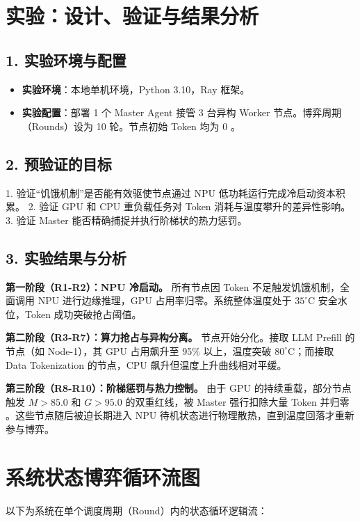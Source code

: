\documentclass[11pt,a4paper]{ctexart}
\begin{document}
\section{实验：设计、验证与结果分析}

\subsection{1. 实验环境与配置}
\begin{itemize}
    \item \textbf{实验环境}：本地单机环境，Python 3.10，Ray 框架。
    \item \textbf{实验配置}：部署 1 个 Master Agent 接管 3 台异构 Worker 节点。博弈周期（Rounds）设为 10 轮。节点初始 Token 均为 0 。
\end{itemize}

\subsection{2. 预验证的目标}
1. 验证“饥饿机制”是否能有效驱使节点通过 NPU 低功耗运行完成冷启动资本积累。
2. 验证 GPU 和 CPU 重负载任务对 Token 消耗与温度攀升的差异性影响。
3. 验证 Master 能否精确捕捉并执行阶梯状的热力惩罚。

\subsection{3. 实验结果与分析}
\textbf{第一阶段（R1-R2）：NPU 冷启动。} 所有节点因 Token 不足触发饥饿机制，全面调用 NPU 进行边缘推理，GPU 占用率归零。系统整体温度处于 $35^\circ\text{C}$ 安全水位，Token 成功突破抢占阈值。

\textbf{第二阶段（R3-R7）：算力抢占与异构分离。} 节点开始分化。接取 LLM Prefill 的节点（如 Node-1），其 GPU 占用飙升至 95\% 以上，温度突破 $80^\circ\text{C}$；而接取 Data Tokenization 的节点，CPU 飙升但温度上升曲线相对平缓。

\textbf{第三阶段（R8-R10）：阶梯惩罚与热力控制。} 由于 GPU 的持续重载，部分节点触发 $M > 85.0$ 和 $G > 95.0$ 的双重红线，被 Master 强行扣除大量 Token 并归零 。这些节点随后被迫长期进入 NPU 待机状态进行物理散热，直到温度回落才重新参与博弈。


\section{系统状态博弈循环流图}
以下为系统在单个调度周期（Round）内的状态循环逻辑流：
\end{document}
